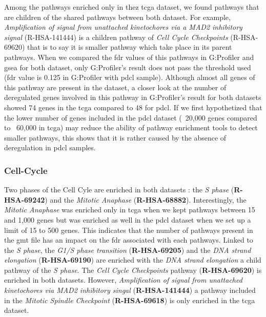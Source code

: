 Among the pathways enriched only in thez \acrshort{tcga} dataset, we found pathways that are children of the shared pathways between both dataset.
For example, \textit{Amplification of signal from unattached kinetochores via a MAD2 inhibitory signal} (R-HSA-141444) is a children pathway of \textit{Cell Cycle Checkpoints} (R-HSA-69620) that is to say it is smaller pathway which take place in its parent pathways.
When we compared the \acrshort{fdr} values of this pathways in G:Profiler and \acrshort{gsea} for both dataset, only G:Profiler's result does not pass the threshold used (\acrshort{fdr} value is 0.125 in G:Profiler with \acrshort{pdcl} sample).
Although almost all genes of this pathway are present in the dataset, a closer look at the number of deregulated genes involved in this pathway in G:Profiler's result for both datasets showed 74 genes in the \acrshort{tcga} compared to 48 for \acrshort{pdcl}.
If we first hypothetized that the lower number of genes included in the \acrshort{pdcl} dataset (~20,000 genes compared to ~60,000 in \acrshort{tcga}) may reduce the ability of pathway enrichment tools to detect smaller pathways, this shows that it is rather caused by the absence of deregulation in \acrshort{pdcl} samples.

\subsubsection{Cell-Cycle}

Two phases of the Cell Cyle are enriched in both datasets : the \textit{S phase} (\textbf{R-HSA-69242}) and the \textit{Mitotic Anaphase} (\textbf{R-HSA-68882}).
Interestingly, the \textit{Mitotic Anaphase}  was enriched only in \acrshort{tcga} when we kept pathways between 15 and 1,000 genes but was enriched as well in the \acrshort{pdcl} dataset when we set up a limit of 15 to 500 genes.
This indicates that the number of pathways present in the \acrshort{gmt} file has an impact on the \acrshort{fdr} associated with each pathways.
Linked to the \textit{S phase}, the \textit{G1/S phase transition} (\textbf{R-HSA-69205}) and the \textit{DNA strand elongation} (\textbf{R-HSA-69190}) are enriched with the \textit{DNA strand elongation} a child pathway of the \textit{S phase}.
The \textit{Cell Cycle Checkpoints} pathway (\textbf{R-HSA-69620}) is enriched in both datasets.
However, \textit{Amplification of signal from unattached kinetochores via MAD2 inhibitory singal} (\textbf{R-HSA-141444}) a pathway included in the \textit{Mitotic Spindle Checkpoint} (\textbf{R-HSA-69618}) is only enriched in the \acrshort{tcga} dataset.

